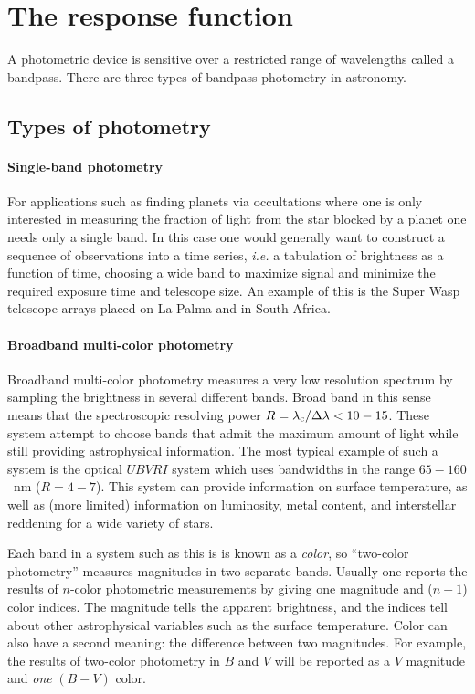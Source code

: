 \section{The response function}

A photometric device is sensitive over a restricted range of
wavelengths called a bandpass. There are three types of bandpass
photometry in astronomy.

\subsection{Types of photometry}

\paragraph{Single-band photometry} For applications such as finding
planets via occultations where one is only interested in measuring the
fraction of light from the star blocked by a planet one needs only a
single band. In this case one would generally want to construct a
sequence of observations into a time series, {\it i.e.} a tabulation
of brightness as a function of time, choosing a wide band to maximize
signal and minimize the required exposure time and telescope size. An
example of this is the Super Wasp telescope arrays placed on La Palma
and in South Africa.
\paragraph{Broadband multi-color photometry} Broadband multi-color
photometry measures a very low resolution spectrum by sampling the
brightness in several different bands. Broad band in this sense means
that the spectroscopic resolving power $R={\lambda_{\rm c}/\Delta
\lambda} < 10-15$. These system attempt to choose bands that admit the
maximum amount of light while still providing astrophysical
information. The most typical example of such a system is the optical $UBVRI$
system which uses bandwidths in the range $65-160$~nm ($R=4-7$). This
system can provide information on surface temperature, as well as
(more limited) information on luminosity, metal content, and
interstellar reddening for a wide variety of stars. 

Each band in a system such as this is is known as a {\it color}, so
``two-color photometry'' measures magnitudes in two separate
bands. Usually one reports the results of $n$-color photometric
measurements by giving one magnitude and ($n-1$) color indices. The
magnitude tells the apparent brightness, and the indices tell about
other astrophysical variables such as the surface temperature. Color
can also have a second meaning: the difference between two
magnitudes. For example, the results of two-color photometry in $B$ and
$V$ will be reported as a $V$ magnitude and {\it one} $(B-V)$ color.
